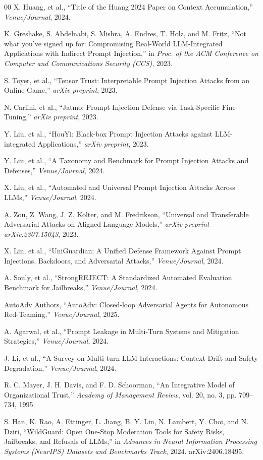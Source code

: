 \documentclass[10pt, a4paper]{article}
\begin{document}
\begin{thebibliography}{00}
X. Huang, et al., ``Title of the Huang 2024 Paper on Context Accumulation,'' \textit{Venue/Journal}, 2024.

K. Greshake, S. Abdelnabi, S. Mishra, A. Endres, T. Holz, and M. Fritz, ``Not what you've signed up for: Compromising Real-World LLM-Integrated Applications with Indirect Prompt Injection,'' in \textit{Proc. of the ACM Conference on Computer and Communications Security (CCS)}, 2023.

S. Toyer, et al., ``Tensor Trust: Interpretable Prompt Injection Attacks from an Online Game,'' \textit{arXiv preprint}, 2023.

N. Carlini, et al., ``Jatmo: Prompt Injection Defense via Task-Specific Fine-Tuning,'' \textit{arXiv preprint}, 2023.

Y. Liu, et al., ``HouYi: Black-box Prompt Injection Attacks against LLM-integrated Applications,'' \textit{arXiv preprint}, 2023.

Y. Liu, et al., ``A Taxonomy and Benchmark for Prompt Injection Attacks and Defenses,'' \textit{Venue/Journal}, 2024.

X. Liu, et al., ``Automated and Universal Prompt Injection Attacks Across LLMs,'' \textit{Venue/Journal}, 2024.

A. Zou, Z. Wang, J. Z. Kolter, and M. Fredrikson, ``Universal and Transferable Adversarial Attacks on Aligned Language Models,'' \textit{arXiv preprint arXiv:2307.15043}, 2023.

X. Lin, et al., ``UniGuardian: A Unified Defense Framework Against Prompt Injections, Backdoors, and Adversarial Attacks,'' \textit{Venue/Journal}, 2024.

A. Souly, et al., ``StrongREJECT: A Standardized Automated Evaluation Benchmark for Jailbreaks,'' \textit{Venue/Journal}, 2024.

AutoAdv Authors, ``AutoAdv: Closed-loop Adversarial Agents for Autonomous Red-Teaming,'' \textit{Venue/Journal}, 2025.

A. Agarwal, et al., ``Prompt Leakage in Multi-Turn Systems and Mitigation Strategies,'' \textit{Venue/Journal}, 2024.

J. Li, et al., ``A Survey on Multi-turn LLM Interactions: Context Drift and Safety Degradation,'' \textit{Venue/Journal}, 2024.

R. C. Mayer, J. H. Davis, and F. D. Schoorman, ``An Integrative Model of Organizational Trust,'' \textit{Academy of Management Review}, vol. 20, no. 3, pp. 709--734, 1995.

S. Han, K. Rao, A. Ettinger, L. Jiang, B. Y. Lin, N. Lambert, Y. Choi, and N. Dziri, ``WildGuard: Open One-Stop Moderation Tools for Safety Risks, Jailbreaks, and Refusals of LLMs,'' in \textit{Advances in Neural Information Processing Systems (NeurIPS) Datasets and Benchmarks Track}, 2024. arXiv:2406.18495.

\end{thebibliography}
\end{document}
